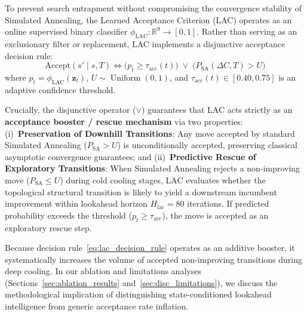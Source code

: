 \documentclass{ieeeaccess}
\begin{document}
To prevent search entrapment without compromising the convergence stability of Simulated Annealing, the Learned Acceptance Criterion (LAC) operates as an online supervised binary classifier $\phi_{\text{LAC}}: \mathbb{R}^9 \to [0, 1]$. Rather than serving as an exclusionary filter or replacement, LAC implements a disjunctive acceptance decision rule:
\begin{equation}
  \text{Accept}(s' \mid s, T) \iff \Big( p_t \ge \tau_{\text{acc}}(t) \Big) \;\lor\; \Big( P_{\text{SA}}(\Delta C, T) > U \Big)
  \label{eq:lac_decision_rule}
\end{equation}
where $p_t = \phi_{\text{LAC}}(\mathbf{z}_t)$, $U \sim \operatorname{Uniform}(0, 1)$, and $\tau_{\text{acc}}(t) \in [0.40, 0.75]$ is an adaptive confidence threshold. 

Crucially, the disjunctive operator ($\lor$) guarantees that LAC acts strictly as an \textbf{acceptance booster / rescue mechanism} via two properties: (i)~\textbf{Preservation of Downhill Transitions}: Any move accepted by standard Simulated Annealing ($P_{\text{SA}} > U$) is unconditionally accepted, preserving classical asymptotic convergence guarantees; and (ii)~\textbf{Predictive Rescue of Exploratory Transitions}: When Simulated Annealing rejects a non-improving move ($P_{\text{SA}} \le U$) during cold cooling stages, LAC evaluates whether the topological structural transition is likely to yield a downstream incumbent improvement within lookahead horizon $H_{\text{lac}} = 80$ iterations. If predicted probability exceeds the threshold ($p_t \ge \tau_{\text{acc}}$), the move is accepted as an exploratory rescue step.

Because decision rule~\eqref{eq:lac_decision_rule} operates as an additive booster, it systematically increases the volume of accepted non-improving transitions during deep cooling. In our ablation and limitations analyses (Sections~\ref{sec:ablation_results} and~\ref{sec:disc_limitations}), we discuss the methodological implication of distinguishing state-conditioned lookahead intelligence from generic acceptance rate inflation.
\end{document}
